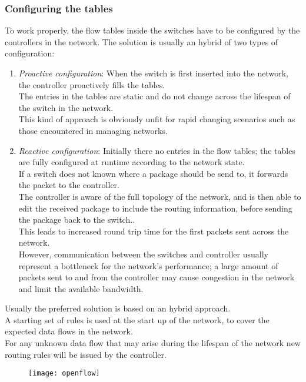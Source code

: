 \subsubsection{Configuring the tables}
To work properly, the flow tables inside the switches have to be configured by the controllers in the network.
The solution is usually an hybrid of two types of configuration:
\begin{enumerate}
	\item \textit{Proactive configuration}: When the switch is first inserted into the network, the controller proactively fills the tables. \\
	The entries in the tables are static and do not change across the lifespan of the switch in the network. \\
	This kind of approach is obviously unfit for rapid changing scenarios such as those encountered in managing networks.
	\item \textit{Reactive configuration}: Initially there no entries in the flow tables; the tables are fully configured at runtime according to the network state. \\
	If a switch does not known where a package should be send to, it forwards the packet to the controller. \\
	The controller is aware of the full topology of the network, and is then able to edit the received package to include the routing information, before sending the package back to the switch..\\
	This leads to increased round trip time for the first packets sent across the network. \\
	However, communication between the switches and controller usually represent a bottleneck for the network's performance; a large amount of packets sent to and from the controller may cause congestion in the network and limit the available bandwidth.
\end{enumerate} 



Usually the preferred solution is based on an hybrid approach. \\
A starting set of rules is used at the start up of the network, to cover the expected data flows in the network. \\
For any unknown data flow that may arise during the lifespan of the network new routing rules will be issued by the controller.

\begin{figure}[h!]
	\texttt{[image: openflow]}
	\centering
\end{figure}


